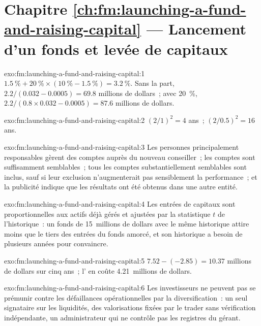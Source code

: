 \section*{Chapitre \ref{ch:fm:launching-a-fund-and-raising-capital} --- Lancement d'un fonds et levée de capitaux}

\begin{solution}{exo:fm:launching-a-fund-and-raising-capital:1}
$1.5~\%+20~\%\times(10~\%-1.5~\%)=3.2~\%$. Sans la part, $2.2/(0.032-0.0005)=69.8$ millions de dollars~; avec 20~\%, $2.2/(0.8\times0.032-0.0005)=87.6$ millions de dollars.
\end{solution}

\begin{solution}{exo:fm:launching-a-fund-and-raising-capital:2}
$(2/1)^2=4$ ans~; $(2/0.5)^2=16$ ans.
\end{solution}

\begin{solution}{exo:fm:launching-a-fund-and-raising-capital:3}
Les personnes principalement responsables gèrent des comptes auprès du nouveau conseiller~; les comptes sont suffisamment semblables~; tous les comptes substantiellement semblables sont
inclus, sauf si leur exclusion n'augmenterait pas sensiblement la performance~; et la publicité indique que les résultats ont été obtenus dans une autre
entité.
\end{solution}

\begin{solution}{exo:fm:launching-a-fund-and-raising-capital:4}
Les entrées de capitaux sont proportionnelles aux actifs déjà gérés et ajustées par la statistique $t$ de l'historique~: un fonds de 15~millions de dollars avec le même historique attire moins
que le tiers des entrées du fonds amorcé, et son historique a besoin de plusieurs années pour convaincre.
\end{solution}

\begin{solution}{exo:fm:launching-a-fund-and-raising-capital:5}
$7.52-(-2.85)=10.37$ millions de dollars sur cinq ans~; l' en coûte 4.21~millions de dollars.
\end{solution}

\begin{solution}{exo:fm:launching-a-fund-and-raising-capital:6}
Les investisseurs ne peuvent pas se prémunir contre les défaillances opérationnelles par la diversification~: un seul signataire sur les liquidités, des valorisations fixées par le trader sans
vérification indépendante, un administrateur qui ne contrôle pas les registres du gérant.
\end{solution}

